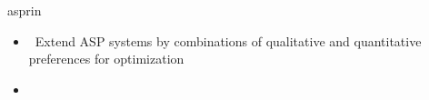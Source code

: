 \begin{frame}{asprin}
  \begin{itemize}
  \item {} \ Extend ASP systems by combinations of qualitative and quantitative preferences for optimization
  \item {} \ \cite{brderosc15a,alrosc18a,brderosc22a}
  \end{itemize}
\end{frame}
%

